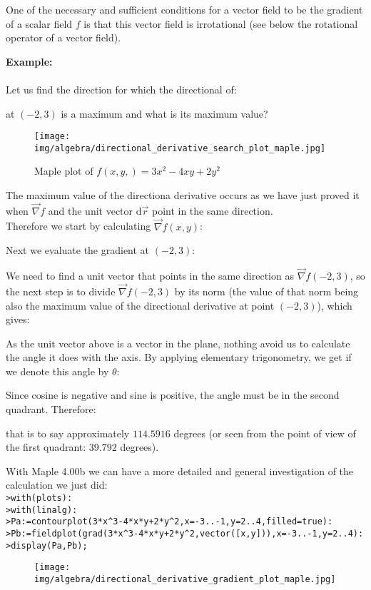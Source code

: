 	\begin{tcolorbox}[title=Remark,colframe=black,arc=10pt]
	One of the necessary and sufficient conditions for a vector field to be the gradient of a scalar field $f$ is that this vector field is irrotational (see below the rotational operator of a vector field).
	\end{tcolorbox}
	\begin{tcolorbox}[colframe=black,colback=white,sharp corners]
	\textbf{{\Large {}}Example:}\\\\
	Let us find the direction for which the directional of:
	
	at $(-2,3)$ is a maximum and what is its maximum value?
	\begin{figure}[H]
		\centering
		\texttt{[image: img/algebra/directional\_derivative\_search\_plot\_maple.jpg]}
		\caption[]{Maple plot of $f(x,y,)=3x^2-4xy+2y^2$}
	\end{figure}
	The maximum value of the directiona derivative occurs as we have just proved it when $\vec{\nabla}f$ and the unit vector $\mathrm{d}\vec{r}$ point in the same direction.\\

	Therefore we start by calculating $\vec{\nabla}f(x,y)$:
	
	Next we evaluate the gradient at $(-2,3)$:
	
	\end{tcolorbox}
	\begin{tcolorbox}[colframe=black,colback=white,sharp corners]
	We need to find a unit vector that points in the same direction as $\vec{\nabla}f(-2,3)$, so the next step is to divide $\vec{\nabla}f(-2,3)$ by its norm (the value of that norm being also the maximum value of the directional derivative at point $(-2,3)$), which gives:
	
	As the unit vector above is a vector in the plane, nothing avoid us to calculate the angle it does with the axis. By applying elementary trigonometry, we get if we denote this angle by $\theta$:
	
	Since cosine is negative and sine is positive, the angle must be in the second quadrant. Therefore:
	
	that is to say approximately $114.5916$ degrees (or seen from the point of view of the first quadrant: $39.792$ degrees).
	
	With Maple 4.00b we can have a more detailed and general investigation of the calculation we just did:\\

	\texttt{>with(plots):\\
	>with(linalg):\\
	>Pa:=contourplot(3*x\string^3-4*x*y+2*y\string^2,x=-3..-1,y=2..4,filled=true):\\
	>Pb:=fieldplot(grad(3*x\string^3-4*x*y+2*y\string^2,vector([x,y])),x=-3..-1,y=2..4):\\
	>display(Pa,Pb);
	}
	\begin{figure}[H]
		\centering
		\texttt{[image: img/algebra/directional\_derivative\_gradient\_plot\_maple.jpg]}
	\end{figure}
	\end{tcolorbox}
